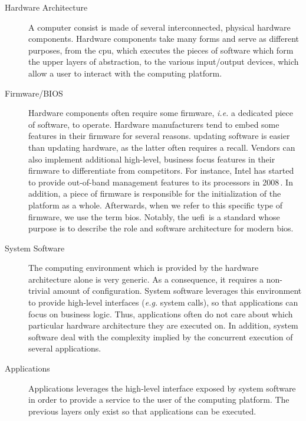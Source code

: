 \begin{description}
\item [Hardware Architecture]
  A computer consist is made of several inter\-connected, physical hardware
  components.
  Hardware components take many forms and serve as different purposes, from the
  \ac{cpu}, which executes the pieces of software which form the upper layers of
  abstraction, to the various input/output devices, which allow a user to
  interact with the computing platform.
\item [Firmware/BIOS]
  Hardware components often require some firm\-ware, \emph{i.e.} a dedicated
  piece of software, to operate.
  Hardware manufacturers tend to embed some features in their firmware for
  several reasons.
   updating software is easier than updating hardware, as the latter
  often requires a recall.
  Vendors can also implement additional high-level, business focus features in
  their firmware to differentiate from competitors.
  For instance, Intel has started to provide out-of-band management features to
  its processors in 2008\,\cite{ruan2014me}.
  In addition, a piece of firmware is responsible for the initialization of the
  platform as a whole.
  Afterwards, when we refer to this specific type of firmware, we use the term
  \ac{bios}.
  Notably, the \ac{uefi}\,\cite{uefi2017uefi} is a standard whose purpose is to
  describe the role and software architecture for modern \ac{bios}.
\item [System Software]
  The computing environment which is provided by the hardware architecture alone
  is very generic.
  As a consequence, it requires a non-trivial amount of configuration.
  System software leverages this environment to provide high-level interfaces
  (\emph{e.g.} system calls), so that applications can focus on business
  logic. Thus, applications often do not care about which particular hardware
  architecture they are executed on.
  In addition, system software deal with the complexity implied by the
  concurrent execution of several applications.
\item [Applications]
  Applications leverages the high-level interface exposed by  system software in
  order to provide a service to the user of the computing platform.
  The previous layers only exist so that applications can be executed.
\end{description}

